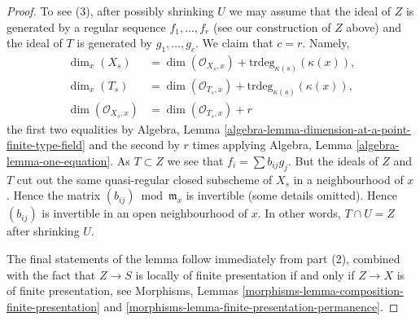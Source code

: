 \documentclass[10pt,a4paper]{amsart}
\theoremstyle{plain}
\theoremstyle{definition}
\theoremstyle{remark}
\numberwithin{equation}{subsection}
\begin{document}
\begin{proof}
\medskip\noindent
To see (3), after possibly shrinking $U$ we may assume that
the ideal of $Z$ is generated by a regular sequence $f_1, \ldots, f_r$
(see our construction of $Z$ above)
and the ideal of $T$ is generated by $g_1, \ldots, g_c$.
We claim that $c = r$. Namely,
\begin{align*}
\dim_x(X_s) & = \dim(\mathcal{O}_{X_s, x}) +
\text{trdeg}_{\kappa(s)}(\kappa(x)), \\
\dim_x(T_s) & = \dim(\mathcal{O}_{T_s, x}) +
\text{trdeg}_{\kappa(s)}(\kappa(x)), \\
\dim(\mathcal{O}_{X_s, x}) & = \dim(\mathcal{O}_{T_s, x}) + r
\end{align*}
the first two equalities by
Algebra, Lemma \ref{algebra-lemma-dimension-at-a-point-finite-type-field}
and the second by $r$ times applying
Algebra, Lemma \ref{algebra-lemma-one-equation}.
As $T \subset Z$ we see that
$f_i = \sum b_{ij} g_j$. But the ideals of $Z$ and $T$ cut out the same
quasi-regular closed subscheme of $X_s$ in a neighbourhood of $x$. Hence
the matrix $(b_{ij}) \bmod \mathfrak m_x$ is invertible (some details
omitted). Hence $(b_{ij})$ is invertible in an
open neighbourhood of $x$. In other words,
$T \cap U = Z$ after shrinking $U$.

\medskip\noindent
The final statements of the lemma follow immediately from
part (2), combined with the fact that $Z \to S$
is locally of finite presentation if and only if $Z \to X$ is
of finite presentation, see
Morphisms, Lemmas \ref{morphisms-lemma-composition-finite-presentation} and
\ref{morphisms-lemma-finite-presentation-permanence}.
\end{proof}
\end{document}
